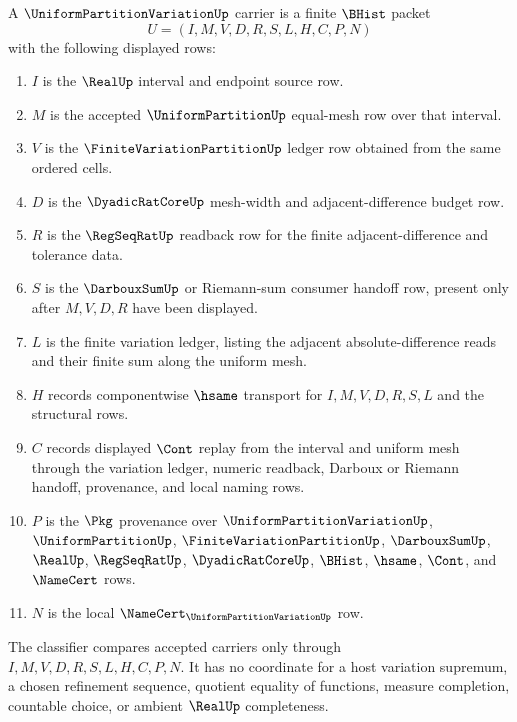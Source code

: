\begin{definition}
\label{def:uniform-partition-variation-carrier}
A $\UniformPartitionVariationUp$ carrier is a finite $\BHist$ packet
$$
U=(I,M,V,D,R,S,L,H,C,P,N)
$$
with the following displayed rows:
\begin{enumerate}
\item $I$ is the $\RealUp$ interval and endpoint source row.
\item $M$ is the accepted $\UniformPartitionUp$ equal-mesh row over that interval.
\item $V$ is the $\FiniteVariationPartitionUp$ ledger row obtained from the same ordered cells.
\item $D$ is the $\DyadicRatCoreUp$ mesh-width and adjacent-difference budget row.
\item $R$ is the $\RegSeqRatUp$ readback row for the finite adjacent-difference and tolerance data.
\item $S$ is the $\DarbouxSumUp$ or Riemann-sum consumer handoff row, present only after $M,V,D,R$ have been displayed.
\item $L$ is the finite variation ledger, listing the adjacent absolute-difference reads and their finite sum along the uniform mesh.
\item $H$ records componentwise $\hsame$ transport for $I,M,V,D,R,S,L$ and the structural rows.
\item $C$ records displayed $\Cont$ replay from the interval and uniform mesh through the variation ledger, numeric readback, Darboux or Riemann handoff, provenance, and local naming rows.
\item $P$ is the $\Pkg$ provenance over $\UniformPartitionVariationUp$, $\UniformPartitionUp$, $\FiniteVariationPartitionUp$, $\DarbouxSumUp$, $\RealUp$, $\RegSeqRatUp$, $\DyadicRatCoreUp$, $\BHist$, $\hsame$, $\Cont$, and $\NameCert$ rows.
\item $N$ is the local $\NameCert_{\UniformPartitionVariationUp}$ row.
\end{enumerate}
The classifier compares accepted carriers only through $I,M,V,D,R,S,L,H,C,P,N$. It has no coordinate for a host variation supremum, a chosen refinement sequence, quotient equality of functions, measure completion, countable choice, or ambient $\RealUp$ completeness.
\end{definition}

